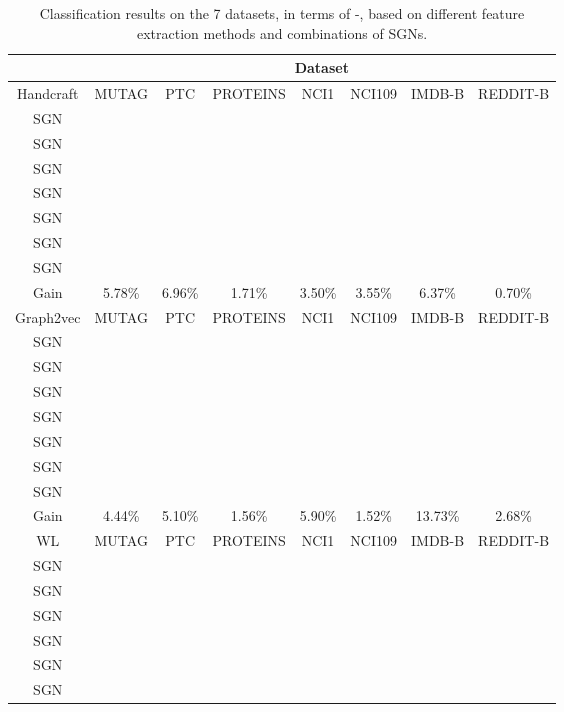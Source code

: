 \documentclass[10pt,journal,compsoc]{IEEEtran}
\begin{document}
\begin{table*}[!t]
\caption{Classification results on the 7 datasets, in terms of -, based on different feature extraction methods and combinations of SGNs.}
\centering
\renewcommand\arraystretch{1.1}
\begin{tabular}{c|cccccccc}
\hline\hline
\multicolumn{2}{c|}{ }& \multicolumn{7}{c}{Dataset} \\
\hline
\multicolumn{2}{c|}{Handcraft}&MUTAG&PTC&PROTEINS&NCI1&NCI109&IMDB-B&REDDIT-B\\
\hline
\multicolumn{2}{c|}{SGN}&&&&&&&
\\
\multicolumn{2}{c|}{SGN}&&&&&&&
\\
\multicolumn{2}{c|}{SGN}&&&&&&&
\\
\multicolumn{2}{c|}{SGN}&&&&&&&
\\
\multicolumn{2}{c|}{SGN}&&&&&&&
\\
\multicolumn{2}{c|}{SGN}&&&&&&&
\\
\multicolumn{2}{c|}{SGN}&&&  &  &  &  &
\\
\hline
\multicolumn{2}{c|}{Gain}&5.78\%&  6.96\%&  1.71\%&  3.50\%&  3.55\%&  6.37\%&  0.70\%\\
\hline
\hline
\multicolumn{2}{c|}{Graph2vec}&MUTAG&PTC&PROTEINS&NCI1&NCI109&IMDB-B&REDDIT-B\\
\hline
\multicolumn{2}{c|}{SGN}&&&&&  &&
\\
\multicolumn{2}{c|}{SGN}&&&&&  &&
\\
\multicolumn{2}{c|}{SGN}&&&&&  &&
\\
\multicolumn{2}{c|}{SGN}&&&&&&&
\\
\multicolumn{2}{c|}{SGN}&&&&  &&&
\\
\multicolumn{2}{c|}{SGN}&&&&&&&
\\
\multicolumn{2}{c|}{SGN}&&&  &&&&
\\
\hline
\multicolumn{2}{c|}{Gain}&4.44\%&  5.10\%&  1.56\%&  5.90\%&  1.52\%&  13.73\%&  2.68\%\\
\hline
\multicolumn{2}{c|}{WL}&MUTAG&PTC&PROTEINS&NCI1&NCI109&IMDB-B&REDDIT-B\\
\hline
\multicolumn{2}{c|}{SGN}&&  &  &  &  &&
\\
\multicolumn{2}{c|}{SGN}&&  &  &  &  &&
\\
\multicolumn{2}{c|}{SGN}&&  &  &  &  &&
\\
\multicolumn{2}{c|}{SGN}&&  &  &  &  &&
\\
\multicolumn{2}{c|}{SGN}&&  &  &  &  &&
\\
\multicolumn{2}{c|}{SGN}&&  &  &  &  &&

\end{tabular}
\end{table*}
\end{document}
